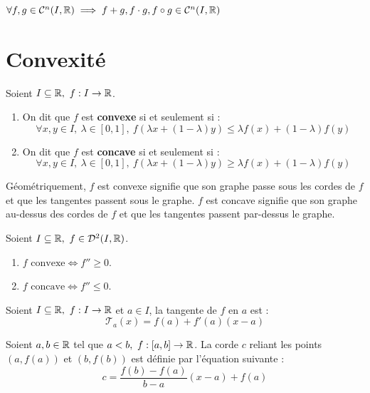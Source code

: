 \begin{proposition}
	$\forall f, g \in \mathcal{C}^n(I, \mathbb{R}) \implies f + g, f \cdot g, f \circ g \in \mathcal{C}^n(I, \mathbb{R})$
\end{proposition}

\section{Convexité}
\begin{definition}
    Soient $I \subseteq \mathbb{R},\ f : I \to \mathbb{R}$.
    \begin{enumerate}
        \item On dit que $f$ est \textbf{convexe} si et seulement si : 
        \[ \forall x, y \in I,\ \lambda \in [0, 1],\ f(\lambda x + (1 - \lambda)y) \leq \lambda f(x) + (1 - \lambda) f(y) \]
        \item On dit que $f$ est \textbf{concave} si et seulement si : 
        \[ \forall x, y \in I,\ \lambda \in [0, 1],\ f(\lambda x + (1 - \lambda)y) \geq \lambda f(x) + (1 - \lambda) f(y) \]
    \end{enumerate}
\end{definition}

\par Géométriquement, $f$ est convexe signifie que son graphe passe sous les cordes de $f$ et que les tangentes passent sous le graphe. $f$ est concave signifie que son graphe au-dessus des cordes de $f$ et que les tangentes passent par-dessus le graphe.

\begin{theorem}
	Soient $I \subseteq \mathbb{R},\ f \in \mathcal{D}^2(I, \mathbb{R})$.
        \begin{enumerate}
                \item $f \text{ convexe} \iff f'' \geq 0$.
                \item $f \text{ concave} \iff f'' \leq 0$.
            \end{enumerate}
\end{theorem}

\begin{proposition}
	Soient $I \subseteq \mathbb{R},\ f : I \to \mathbb{R}$ et $a \in I$, la tangente de $f$ en $a$ est :
	\[ \mathcal{T}_a(x) = f(a) + f'(a)(x - a) \]
\end{proposition}

\begin{proposition}
	Soient $a, b \in \mathbb{R}$ tel que $a < b,\ f : [a, b] \to \mathbb{R}$.
	La corde $c$ reliant les points $(a, f(a))$ et $(b, f(b))$ est définie par l'équation suivante :
	\[ c = \frac{f(b) - f(a)}{b - a} (x - a) + f(a) \]
\end{proposition}

